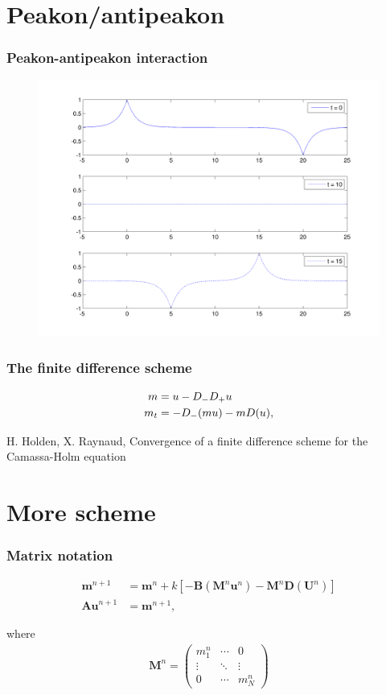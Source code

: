 \documentclass{beamer}
\begin{document}
\section{Peakon/antipeakon}
\begin{frame}
\frametitle{Peakon-antipeakon interaction}
\begin{figure}
\includegraphics[width=0.8\linewidth]{gfx/peakonantipeakon}
\end{figure}

\end{frame}


\begin{frame}
\frametitle{The finite difference scheme}

\begin{align*}
m &= u - D_- D_+ u \notag \\
m_t &=- D_- ( m u ) - m D ( u ), 
\end{align*} 

\vspace{3.5cm}

\tiny{H. Holden, X. Raynaud, Convergence of a finite difference scheme for the Camassa-Holm equation}


\end{frame}



\section*{More scheme}
\begin{frame}
\frametitle{Matrix notation}
\begin{align*}
\bm{m}^{n+1} &= \bm{m}^{n} + k \left[- \bm{B} (\bm{M}^n \bm{u}^n) - \bm{M}^n \bm{D} (\bm{U}^n)\right] \\
\bm{Au}^{n + 1} &= \bm{m}^{n+1},
\end{align*}

where 
\begin{align*}
\bm{M}^n = 
\begin{pmatrix}
  m_1^{n} & \cdots & 0 \\
  \vdots  & \ddots & \vdots  \\
  0 & \cdots & m_N^n
 \end{pmatrix}
\end{align*}

\end{frame}
\end{document}
